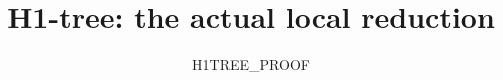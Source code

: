 \documentclass[11pt,reqno]{amsart}
\begin{document}
\title{H1-tree: the actual local reduction}
\author{H1TREE\_PROOF}
\maketitle

\end{document}
